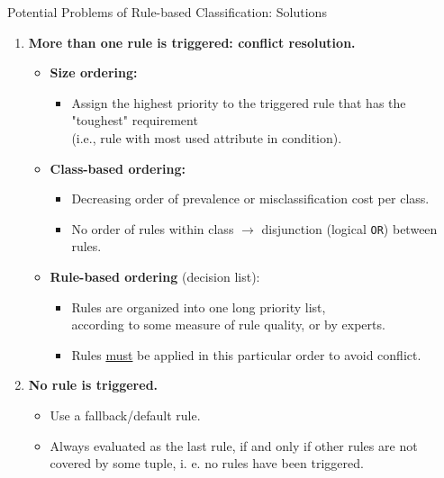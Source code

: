 \begin{frame}{Potential Problems of Rule-based Classification: Solutions}
	\begin{enumerate}
		\item \textbf{More than one rule is triggered: {\color{airforceblue}conflict resolution}.}
		      \begin{itemize}
			      \item \textbf{\color{airforceblue}Size ordering:}
			            \begin{itemize}
				            \item Assign the highest priority to the triggered rule that has the "toughest" requirement \\ (i.e., rule with most used attribute in condition).
			            \end{itemize}
			      \item \textbf{\color{airforceblue}Class-based ordering:}
			            \begin{itemize}
				            \item Decreasing order of prevalence or misclassification cost per class.
				            \item No order of rules within class $\rightarrow$ disjunction (logical \texttt{OR}) between rules.
			            \end{itemize}
			      \item \textbf{\color{airforceblue}Rule-based ordering} (decision list):
			            \begin{itemize}
				            \item Rules are organized into one long priority list,\\
				                  according to some measure of rule quality, or by experts.
				            \item Rules \underline{must} be applied in this particular order to avoid conflict.
			            \end{itemize}
		      \end{itemize}
		\item \textbf{No rule is triggered.}
		      \begin{itemize}
			      \item Use a fallback/default rule.
			      \item Always evaluated as the last rule, if and only if other rules are not covered by some tuple, i. e. no rules have been triggered.
		      \end{itemize}
	\end{enumerate}
\end{frame}

